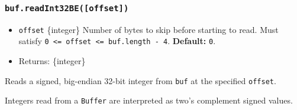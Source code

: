 \subsubsection{\texorpdfstring{\texttt{buf.readInt32BE({[}offset{]})}}{buf.readInt32BE({[}offset{]})}}\label{buf.readint32beoffset}

\begin{itemize}
\tightlist
\item
  \texttt{offset} \{integer\} Number of bytes to skip before starting to
  read. Must satisfy
  \texttt{0\ \textless{}=\ offset\ \textless{}=\ buf.length\ -\ 4}.
  \textbf{Default:} \texttt{0}.
\item
  Returns: \{integer\}
\end{itemize}

Reads a signed, big-endian 32-bit integer from \texttt{buf} at the
specified \texttt{offset}.

Integers read from a \texttt{Buffer} are interpreted as two's complement
signed values.

\begin{Shaded}
\begin{Highlighting}[]
\NormalTok{ \{ }\NormalTok{ \} } \OperatorTok{;}

\OperatorTok{=} \NormalTok{([}\OperatorTok{,} \OperatorTok{,} \OperatorTok{,} \NormalTok{])}\OperatorTok{;}

\NormalTok{(}\NormalTok{))}\OperatorTok{;}
\end{Highlighting}
\end{Shaded}

\begin{Shaded}
\begin{Highlighting}[]
\NormalTok{ \{ }\NormalTok{ \} }\OperatorTok{=} \NormalTok{(}\NormalTok{)}\OperatorTok{;}

\OperatorTok{=} \NormalTok{([}\OperatorTok{,} \OperatorTok{,} \OperatorTok{,} \NormalTok{])}\OperatorTok{;}

\NormalTok{(}\NormalTok{))}\OperatorTok{;}
\end{Highlighting}
\end{Shaded}

